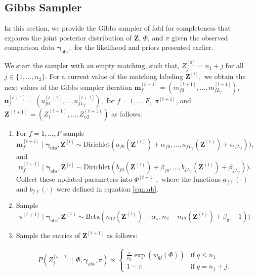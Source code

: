 \documentclass[ba]{imsart}
\newcommand{\bem}{\boldsymbol{m}}
\newcommand{\bu}{\boldsymbol{u}}
\newcommand{\bZ}{\boldsymbol{Z}}
\newcommand{\bgamma}{\boldsymbol{\gamma}}
\begin{document}
\subsection{Gibbs Sampler}
\label{sec:gibbs}
In this section, we provide the Gibbs sampler of fabl for completeness that explores the joint posterior distribution of $\bZ$, $\Phi$, and $\pi$ given the observed comparison data $\bgamma_{\text{obs}},$ for the likelihood and priors presented earlier. 

We start the sampler with an empty matching, such that, $Z_{j}^{[0]} = n_1 + j$ for all $j \in \{1, \ldots, n_2 \}.$ For a current value of the matching labeling $\bZ^{[t]},$ we obtain the next values of the Gibbs sampler iteration 
$\bem_f^{[t+1]} = (m_{f0}^{[t+1]}, \ldots, m_{f L_f}^{[t+1]})$, 
$\bu_f^{[t+1]} =  (u_{f0}^{[t+1]}, \ldots, u_{f L_f}^{[t+1]}),$ for $f=1, \ldots, F,$ 
$\pi^{[t+1]}$, and $\bZ^{(t+1)} = (Z_1^{(t+1)}, \ldots, Z_{n2}^{(t+1)})$ as follows:

\begin{enumerate}
\item For $f=1, \ldots, F$ sample
$$\bem_f^{[t+1]} \mid \bgamma_{\text{obs}}, \bZ^{[t]} \sim
\text{Dirichlet}(
a_{f0}(\bZ^{(t)})  + \alpha_{f0}, \ldots, a_{f L_f}(\bZ^{(t)} ) + \alpha_{f L_f})
),
$$
and
$$\bu_f^{[t+1]} \mid \bgamma_{\text{obs}}, \bZ^{[t]} \sim
\text{Dirichlet}(
b_{f0}(\bZ^{(t)})  + \beta_{f0}, \ldots, b_{f L_f}(\bZ^{(t)} ) + \beta_{f L_f})
). 
$$
Collect these updated parameters into $\Phi^{[t+1]},$ where the functions $a_{f \ell}(\cdot)$ and $b_{f \ell}(\cdot)$ were defined in equation \ref{eqn:ab}. 
\item Sample $$\pi^{[t+1]} \mid  \bgamma_{\text{obs}}, \bZ^{(t)}
\sim \text{Beta}(
n_{12}(\bZ^{(t)} )+ \alpha_{\pi}, n_2 - n_{12}(\bZ^{(t)}) + \beta_{\pi} - 1)
)
$$
\item Sample the entries of $\bZ^{[t+1]}$ as follows:


\begin{align}
\label{eqn:partition-independent}
P(Z_{j}^{[t+1]} \mid \Phi, \bgamma_{obs}, \pi) \propto 
\begin{cases}
\frac{\pi}{n_1}\exp(w_{qj}(\Phi) )  & \text{if} \; q \leq n_1 \\
1- \pi
   &  \text{if} \; q = n_1 + j.
\end{cases}
\end{align}
\end{enumerate}
\end{document}
